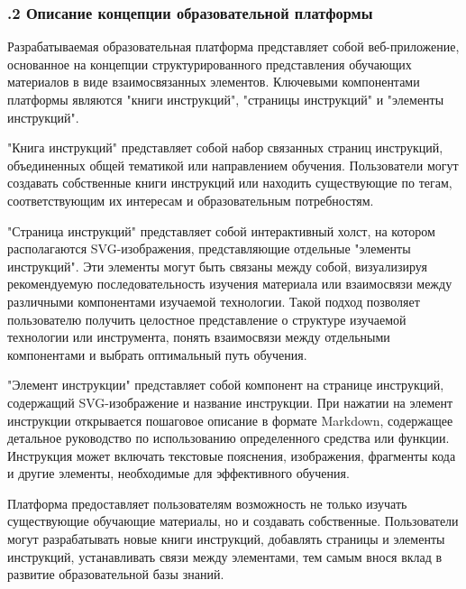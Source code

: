 \subtitlespace

\subsubsection*{ 
  \gostTitleFont
  .2 Описание концепции образовательной платформы
} 

\subtitlespace

{\gostFont

  \par \redline Разрабатываемая образовательная платформа представляет собой веб-приложение, основанное на концепции структурированного представления обучающих материалов в виде взаимосвязанных элементов. Ключевыми компонентами платформы являются "книги инструкций", "страницы инструкций" и "элементы инструкций".

  \par \redline "Книга инструкций" представляет собой набор связанных страниц инструкций, объединенных общей тематикой или направлением обучения. Пользователи могут создавать собственные книги инструкций или находить существующие по тегам, соответствующим их интересам и образовательным потребностям.

  \par \redline "Страница инструкций" представляет собой интерактивный холст, на котором располагаются SVG-изображения, представляющие отдельные "элементы инструкций". Эти элементы могут быть связаны между собой, визуализируя рекомендуемую последовательность изучения материала или взаимосвязи между различными компонентами изучаемой технологии. Такой подход позволяет пользователю получить целостное представление о структуре изучаемой технологии или инструмента, понять взаимосвязи между отдельными компонентами и выбрать оптимальный путь обучения.

  \par \redline "Элемент инструкции" представляет собой компонент на странице инструкций, содержащий SVG-изображение и название инструкции. При нажатии на элемент инструкции открывается пошаговое описание в формате Markdown, содержащее детальное руководство по использованию определенного средства или функции. Инструкция может включать текстовые пояснения, изображения, фрагменты кода и другие элементы, необходимые для эффективного обучения.

  \par \redline Платформа предоставляет пользователям возможность не только изучать существующие обучающие материалы, но и создавать собственные. Пользователи могут разрабатывать новые книги инструкций, добавлять страницы и элементы инструкций, устанавливать связи между элементами, тем самым внося вклад в развитие образовательной базы знаний.

}
